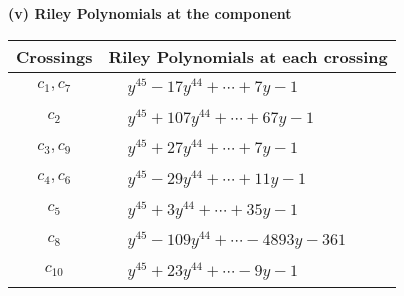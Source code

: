 \documentclass[1p]{elsarticle_modified}
\theoremstyle{definition}
\begin{document}
\newpage\renewcommand{\arraystretch}{1}
\flushleft \textbf{(v) Riley Polynomials at the component}\newline \\
\begin{tabular}{m{50pt}|m{274pt}}
Crossings & \hspace{64pt}Riley Polynomials at each crossing \\
\hline $$\begin{aligned}c_{1},c_{7}\end{aligned}$$&$\begin{aligned}
&y^{45}-17 y^{44}+\cdots+7 y-1
\end{aligned}$\\
\hline $$\begin{aligned}c_{2}\end{aligned}$$&$\begin{aligned}
&y^{45}+107 y^{44}+\cdots+67 y-1
\end{aligned}$\\
\hline $$\begin{aligned}c_{3},c_{9}\end{aligned}$$&$\begin{aligned}
&y^{45}+27 y^{44}+\cdots+7 y-1
\end{aligned}$\\
\hline $$\begin{aligned}c_{4},c_{6}\end{aligned}$$&$\begin{aligned}
&y^{45}-29 y^{44}+\cdots+11 y-1
\end{aligned}$\\
\hline $$\begin{aligned}c_{5}\end{aligned}$$&$\begin{aligned}
&y^{45}+3 y^{44}+\cdots+35 y-1
\end{aligned}$\\
\hline $$\begin{aligned}c_{8}\end{aligned}$$&$\begin{aligned}
&y^{45}-109 y^{44}+\cdots-4893 y-361
\end{aligned}$\\
\hline $$\begin{aligned}c_{10}\end{aligned}$$&$\begin{aligned}
&y^{45}+23 y^{44}+\cdots-9 y-1
\end{aligned}$\\
\hline
\end{tabular}\\~\\
\end{document}
